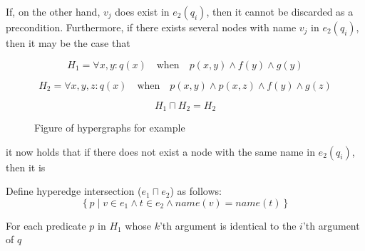 \documentclass[../Master.tex]{subfiles}
\providecommand{\master}{..}
\begin{document}
If, on the other hand, $v_j$ does exist in $e_2(q_i)$, then it cannot be discarded as a precondition. Furthermore, if there exists several nodes with name $v_j$ in $e_2(q_i)$, then it may be the case that

\begin{example} \label{ex:ca:hgma:generalization}
    \begin{equation*}
        H_1 = \forall x, y : q(x) \quad \text{when} \quad
            p(x,y) \land f(y) \land g(y)
    \end{equation*}

    \begin{equation*}
        H_2 = \forall x, y, z : q(x) \quad \text{when} \quad
            p(x, y) \land p(x,z) \land f(y) \land g(z)
    \end{equation*}

    \begin{equation*}
        H_1 \sqcap H_2 = H_2
    \end{equation*}

    \begin{figure}
        \centering
        \begin{subfigure}[b]{0.3\textwidth}
            \centering
            \scalebox{1}{}
            \caption{}
            \label{fig:ex:ca:hgma:ex:generalization1}
        \end{subfigure}%
        \hfill%
        \begin{subfigure}[b]{0.3\textwidth}
            \centering
            \scalebox{0.75}{}
            \caption{}
            \label{fig:ex:ca:hgma:ex:generalization1}
        \end{subfigure}
        \caption{} Figure of hypergraphs for example
    \end{figure}

\end{example}



it now holds that if there does not exist a node with the same name in $e_2(q_i)$, then it is

Define hyperedge intersection ($e_1 \sqcap e_2$) as follows:
\begin{equation}
    \left\{
        p \; | \; v \in e_1 \land t \in e_2 \land name(v) = name(t)
    \right\}
\end{equation}

For each predicate $p$ in $H_1$ whose $k$'th argument is identical to the $i$'th argument of $q$
\end{document}
